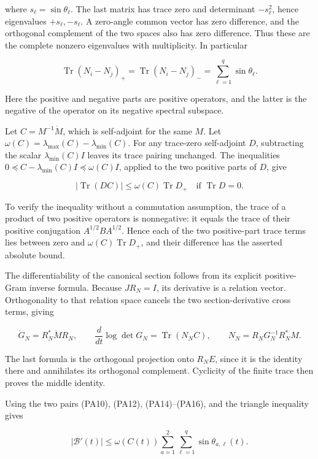 where \(s_\ell=\sin\theta_\ell\). The last matrix has trace zero and determinant \(-s_\ell^2\), hence eigenvalues \(+s_\ell,-s_\ell\). A zero-angle common vector has zero difference, and the orthogonal complement of the two spaces also has zero difference. Thus these are the complete nonzero eigenvalues with multiplicity. In particular

\[
\operatorname{Tr}(N_i-N_j)_+
=\operatorname{Tr}(N_i-N_j)_-
=\sum_{\ell=1}^q\sin\theta_\ell.
\tag{PA14}
\]

Here the positive and negative parts are positive operators, and the latter is the negative of the operator on its negative spectral subspace.

Let \(C=M^{-1}\dot M\), which is self-adjoint for the same \(M\). Let \(\omega(C)=\lambda_{\max}(C)-\lambda_{\min}(C)\). For any trace-zero self-adjoint \(D\), subtracting the scalar \(\lambda_{\min}(C)I\) leaves its trace pairing unchanged. The inequalities \(0\preceq C-\lambda_{\min}(C)I\preceq\omega(C)I\), applied to the two positive parts of \(D\), give

\[
|\operatorname{Tr}(DC)|
\le\omega(C)\operatorname{Tr}D_+
\quad\text{if }\operatorname{Tr}D=0.
\tag{PA15}
\]

To verify the inequality without a commutation assumption, the trace of a product of two positive operators is nonnegative: it equals the trace of their positive conjugation \(A^{1/2}BA^{1/2}\). Hence each of the two positive-part trace terms lies between zero and \(\omega(C)\operatorname{Tr}D_+\), and their difference has the asserted absolute bound.

The differentiability of the canonical section follows from its explicit positive-Gram inverse formula. Because \(JR_N=I\), its derivative is a relation vector. Orthogonality to that relation space cancels the two section-derivative cross terms, giving

\[
\dot G_N=R_N^*\dot M R_N,
\qquad
\frac{d}{dt}\log\det G_N
=\operatorname{Tr}(N_NC),
\qquad N_N=R_NG_N^{-1}R_N^*M.
\tag{PA16}
\]

The last formula is the orthogonal projection onto \(R_NE\), since it is the identity there and annihilates its orthogonal complement. Cyclicity of the finite trace then proves the middle identity.

Using the two pairs (PA10), (PA12), (PA14)--(PA16), and the triangle inequality gives

\[
\boxed{
|\mathcal B'(t)|
\le \omega(C(t))\sum_{a=1}^2\sum_{\ell=1}^q
                  \sin\theta_{a,\ell}(t).
}
\tag{PA17}
\]

